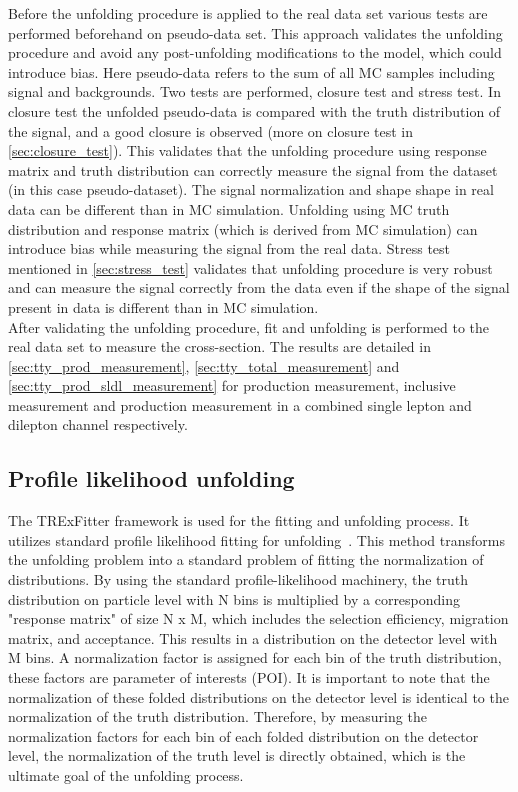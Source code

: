 Before the unfolding procedure is applied to the real data set various tests are performed beforehand on pseudo-data set. This approach validates the unfolding procedure and avoid any post-unfolding modifications to the model, which could introduce bias. Here pseudo-data refers to the sum of all MC samples including signal and backgrounds. Two tests are performed, closure test and stress test. In closure test the unfolded pseudo-data is compared with the truth distribution of the signal, and a good closure is observed (more on closure test in \cref{sec:closure_test}). This validates that the unfolding procedure using response matrix and truth distribution can correctly measure the signal from the dataset (in this case pseudo-dataset). The signal normalization and shape shape in real data can be different than in MC simulation. Unfolding using MC truth distribution and response matrix (which is derived from MC simulation) can introduce bias while measuring the signal from the real data. Stress test mentioned in \cref{sec:stress_test} validates that unfolding procedure is very robust and can measure the signal correctly from the data even if the shape of the signal present in data is different than in MC simulation. \\ 

After validating the unfolding procedure, fit and unfolding is performed to the real data set to measure the cross-section. The results are detailed in \cref{sec:tty_prod_measurement}, \cref{sec:tty_total_measurement} and \cref{sec:tty_prod_sldl_measurement} for \tty production measurement, inclusive \tty measurement and \tty production measurement in a combined single lepton and dilepton channel respectively.



\subsection{Profile likelihood unfolding}
\label{sec:profile-likelihodd-unfolding}
The TRExFitter framework is used for the fitting and unfolding process. It utilizes standard profile likelihood fitting for unfolding~\cite{cls_3}. This method transforms the unfolding problem into a standard problem of fitting the normalization of distributions. By using the standard profile-likelihood machinery, the truth distribution on particle level with N bins is multiplied by a corresponding "response matrix" of size N x M, which includes the selection efficiency, migration matrix, and acceptance. This results in a distribution on the detector level with M bins. A normalization factor is assigned for each bin of the truth distribution, these factors are parameter of interests (POI). It is important to note that the normalization of these folded distributions on the detector level is identical to the normalization of the truth distribution. Therefore, by measuring the normalization factors for each bin of each folded distribution on the detector level, the normalization of the truth level is directly obtained, which is the ultimate goal of the unfolding process.

